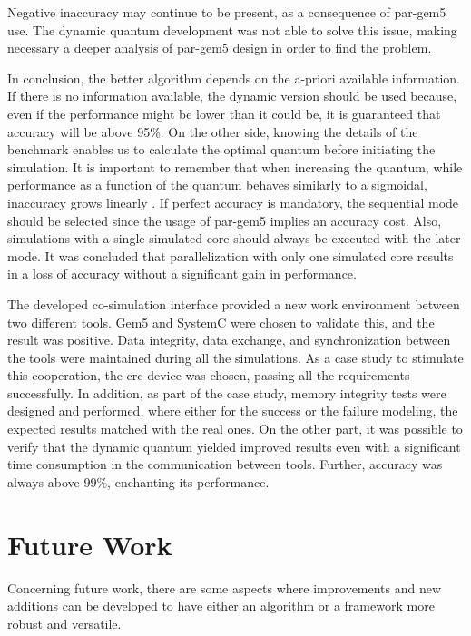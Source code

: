 Negative inaccuracy may continue to be present, as a consequence of par-gem5 use. The dynamic quantum development was not able to solve this
issue, making necessary a deeper analysis of par-gem5 design in order to find the problem. 

In conclusion, the better algorithm depends on the a-priori available information. If there is no information available, the dynamic version should be 
used because, even if the performance might be lower than it could be, it is guaranteed that accuracy will be above 95\%. On the other side,
knowing the details of the benchmark enables us to calculate the optimal quantum before initiating the simulation. It is important to 
remember that when increasing the quantum, while performance as a function of the quantum behaves similarly to a sigmoidal, inaccuracy 
grows linearly \cite*{BeyondQuantumTDSim}. If perfect accuracy is mandatory, the sequential mode should be selected since the usage of par-gem5 
implies an accuracy cost. Also, simulations with a single simulated core should always be 
executed with the later mode. It was concluded that parallelization with only one simulated core results in a loss of accuracy 
without a significant gain in performance.

The developed co-simulation interface provided a new work environment between two different tools. Gem5 and SystemC were chosen to validate 
this, and the result was positive. Data integrity, data exchange, and synchronization between the tools were maintained during all the simulations. 
As a case study to stimulate this cooperation, the \gls{crc} device was chosen, 
passing all the requirements successfully. In addition, as part of the case study, 
memory integrity tests were designed and performed, where either for the success or the failure modeling, the expected results matched
with the real ones. On the other part, it was possible to verify that the dynamic quantum yielded improved results even with a significant 
time consumption in the communication between tools. Further, accuracy was always above 99\%, enchanting its performance. 

\section{Future Work}

Concerning future work, there are some aspects where improvements and new additions can be developed to have either an 
algorithm or a framework more robust and versatile.

